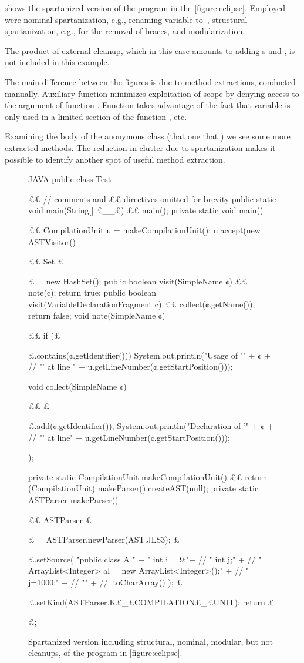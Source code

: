 \begin{description}
 shows the spartanized version of the program in
the \cref{figure:eclipse}. Employed were nominal spartanization, e.g., renaming
variable  to~\cc{\$}, structural spartanization, e.g., for the
removal of braces, and modularization.

The product of external cleanup, which in this case amounts to adding
s and , is not included in this example.

The main difference between the figures is due to method extractions, conducted
manually. Auxiliary  function  minimizes exploitation of
scope by denying access to the  argument of function .
Function  takes advantage of the fact that variable
 is only used in a limited section of the  function
, etc.

Examining the body of the anonymous class (that one that 
) we see some more extracted methods. The reduction in clutter
due to spartanization makes it possible to identify another spot of useful
method extraction.

\begin{figure}
  \caption{Spartanized version including structural, nominal, modular, but
    not cleanups, of the \Java program in \cref{figure:eclipse}.}
  \label{figure:eclipse:spartan}
  \begin{adjustbox}{max width = \columnwidth}
\begin{code}[minipage, width=1.13\columnwidth]{JAVA}
public class Test {££ // comments and ££ directives omitted for brevity
  public static void main(String[] £\_\_£) {££ main(); }
  private static void main() {££
    CompilationUnit u = makeCompilationUnit();
    u.accept(new ASTVisitor() {££
      Set £\ignore$£$ = new HashSet();
      public boolean visit(SimpleName ¢) {££
        note(¢);
        return true;
      }
      public boolean visit(VariableDeclarationFragment ¢) {££
        collect(¢.getName());
        return false;
      }
      void note(SimpleName ¢) {££
        if (£\ignore$£$.contains(¢.getIdentifier()))
          System.out.println("Usage of '" + ¢ + //
            "' at line " + u.getLineNumber(¢.getStartPosition()));
      }
      void collect(SimpleName ¢) {££
        £\ignore$£$.add(¢.getIdentifier());
        System.out.println("Declaration of '" + ¢ + //
          "' at line" + u.getLineNumber(¢.getStartPosition()));
      }
    });
  }
  private static CompilationUnit makeCompilationUnit() {££
    return (CompilationUnit) makeParser().createAST(null);
  }
  private static ASTParser makeParser() {££
    ASTParser £\ignore$£$ = ASTParser.newParser(AST.JLS3);
    £\ignore$£$.setSource(
      "public class A {\n" +
      " int i = 9;\n"+ //
      " int j;\n" + //
      " ArrayList<Integer> al = new ArrayList<Integer>();\n" + //
      " j=1000;\n" + //
      "}\n" + //
      .toCharArray()
);
    £\ignore$£$.setKind(ASTParser.K£\_£COMPILATION£\_£UNIT);
    return £\ignore$£$;
  }
}
\end{code}
  \end{adjustbox}
\end{figure}


\end{description}
